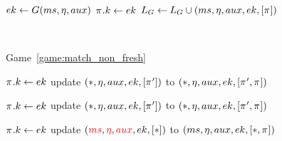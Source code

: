 \begin{figure}
\begin{leftfullpage}
\begin{adjustbox}{tabular={cc},Trim=0.9ex 0 0 0, width=\textwidth}
\begin{adjustbox}{minipage=[t][]{\codewidth},fbox}
\begin{algorithmic}[1]
			\color{black}
			
			\Else 
				\State {}
				\State $ek \gets G(ms, \eta, aux)$
				\State $\oracle.\key \gets ek$
				\State $L_G \gets L_G \cup  (ms, \nonce, aux, ek, [\oracle]) $
			\EndIf
			

			
		\end{algorithmic}
	\end{adjustbox}
	

	\\

	\begin{adjustbox}{minipage=[t][]{\codewidth},fbox}
		\begin{algorithmic}[1]
		
			\Statex
			\Comment Game~\ref{game:match_non_fresh}
			\State {}
			
				\State $\oracle.\key \gets ek$
				\State update $(*, \nonce, aux, ek, [\oracle'])$ to $(*, \nonce, aux, ek, [\oracle', \oracle])$
		
			\color{black}
		
			\State \hspace*{-\algorithmicindent} 
				\State $\oracle.\key \gets ek$
				\State update $(*, \nonce, aux, ek, [\oracle'])$ to $(*, \nonce, aux, ek, [\oracle', \oracle])$
			
			\color{black}
		
			\State \hspace*{-\algorithmicindent} 
				\State $\oracle.\key \gets ek$
				\State update $(\textcolor{red}{ms},\textcolor{red}{\eta}, \textcolor{red}{aux}, ek, [*])$ to $(ms, \nonce, aux, ek, [*,\oracle])$
			

\end{algorithmic}
\end{adjustbox}
\end{adjustbox}
\end{leftfullpage}
\end{figure}
